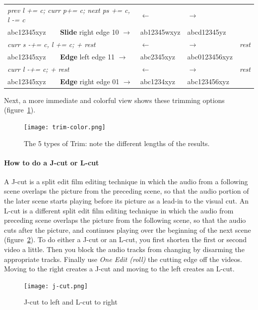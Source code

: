 \begin{center}
\begin{longtable}{lllll}
			\midrule
			\multicolumn{2}{l}{\textit{prev l += c; curr p+= c; next ps += c, l -= c}} & $\leftarrow$ & $\rightarrow$ &\\
			abc12345xyz & \textbf{Slide} right edge 10 $\rightarrow$ & ab12345wxyz & abcd12345yz &\\
			\midrule
			\multicolumn{2}{l}{\textit{curr s -+= c, l += c; + rest}} & $\leftarrow$ & $\rightarrow$ & \textit{rest}\\
			abc12345xyz & \textbf{Edge} left edge 11 $\rightarrow$ & abc2345xyz & abc0123456xyz &\\
			\midrule
			\multicolumn{2}{l}{\textit{curr l -+= c; + rest}} & $\leftarrow$ & $\rightarrow$ & \textit{rest}\\
			abc12345xyz & \textbf{Edge} right edge 01 $\rightarrow$ & abc1234xyz & abc123456xyz &\\
			\bottomrule
		\end{longtable}
\end{center}
\renewcommand{\arraystretch}{1}

Next, a more immediate and colorful view shows these trimming
options (figure~\ref{fig:trim-color}).

\begin{figure}[htpb]
	\centering
	\texttt{[image: trim-color.png]}
	\caption{The 5 types of Trim: note the different lengths of the results.}
	\label{fig:trim-color}
\end{figure}

\paragraph{How to do a J-cut or L-cut} A J-cut is a split edit film
editing technique in which the audio from a following scene overlaps
the picture from the preceding scene, so that the audio portion of
the later scene starts playing before its picture as a lead-in to
the visual cut.  An L-cut is a different split edit film editing
technique in which the audio from preceding scene overlaps the
picture from the following scene, so that the audio cuts after the
picture, and continues playing over the beginning of the next scene
(figure~\ref{fig:j-cut}). To do either a J-cut or an L-cut, you
first shorten the first or second video a little.  Then you block
the audio tracks from changing by disarming the appropriate tracks.
Finally use \textit{One Edit (roll)} the cutting edge off the
videos.  Moving to the right creates a J-cut and moving to the left
creates an L-cut.

\begin{figure}[htpb]
	\centering
	\texttt{[image: j-cut.png]}
	\caption{J-cut to left and L-cut to right}
	\label{fig:j-cut}
\end{figure}


